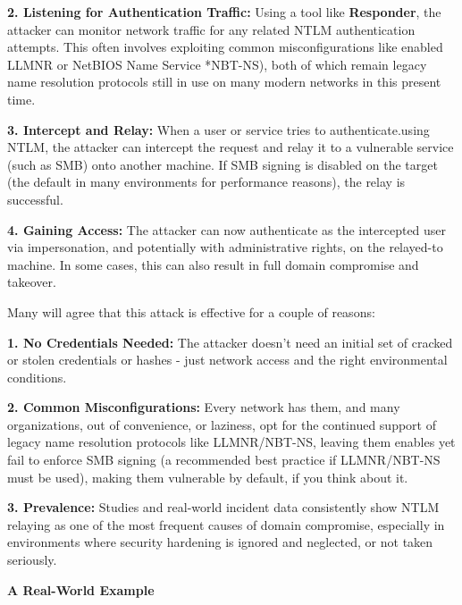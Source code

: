 \textbf{2. Listening for Authentication Traffic: }Using a tool like \textbf{Responder}, the attacker can monitor network traffic for any related NTLM authentication attempts. This often involves exploiting common misconfigurations like enabled LLMNR or NetBIOS Name Service *NBT-NS), both of which remain legacy name resolution protocols still in use on many modern networks in this present time.

\textbf{3. Intercept and Relay: }When a user or service tries to authenticate.using NTLM, the attacker can intercept the request and relay it to a vulnerable service (such as SMB) onto another machine. If SMB signing is disabled on the target (the default in many environments for performance reasons), the relay is successful.

\textbf{4. Gaining Access: }The attacker can now authenticate as the intercepted user via impersonation, and potentially with administrative rights, on the relayed-to machine. In some cases, this can also result in full domain compromise and takeover.

Many will agree that this attack is effective for a couple of reasons:

\textbf{1. No Credentials Needed: }The attacker doesn’t need an initial set of cracked or stolen credentials or hashes - just network access and the right environmental conditions.

\textbf{2. Common Misconfigurations: }Every network has them, and many organizations, out of convenience, or laziness, opt for the continued support of legacy name resolution protocols like LLMNR/NBT-NS, leaving them enables yet fail to enforce SMB signing (a recommended best practice if LLMNR/NBT-NS must be used), making them vulnerable by default, if you think about it.

\textbf{3. Prevalence: }Studies and real-world incident data consistently show NTLM relaying as one of the most frequent causes of domain compromise, especially in environments where security hardening is ignored and neglected, or not taken seriously.

\textbf{A Real-World Example}

